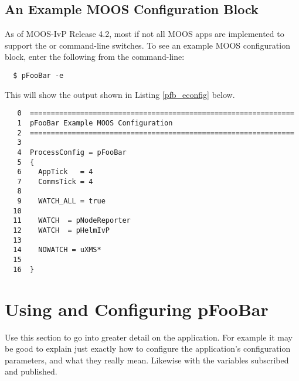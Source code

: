 \subsection{An Example MOOS Configuration Block}

As of MOOS-IvP Release 4.2, most if not all MOOS apps are implemented
to support the  or  command-line switches. To
see an example MOOS configuration block, enter the following from the
command-line:

\small
\begin{verbatim}
  $ pFooBar -e
\end{verbatim}
\normalsize
\vspace{0.05in}

\noindent
This will show the output shown in Listing \ref{pfb_econfig} below.

\vspace{0.25in}
\label{pfb_econfig}
\footnotesize
\begin{verbatim}
   0  =============================================================== 
   1  pFooBar Example MOOS Configuration                        
   2  =============================================================== 
   3  
   4  ProcessConfig = pFooBar
   5  {                                                               
   6    AppTick   = 4                                                 
   7    CommsTick = 4                                                 
   8                                                                  
   9    WATCH_ALL = true                                              
  10                                                                  
  11    WATCH  = pNodeReporter 
  12    WATCH  = pHelmIvP                                             
  13                                                                  
  14    NOWATCH = uXMS*                                               
  15                                                                  
  16  }                                               
\end{verbatim}
\normalsize
 
\section{Using and Configuring pFooBar}
\label{sec_pfoobar_usage}

Use this section to go into greater detail on the application. For example
it may be good to explain just exactly how to configure the application's
configuration parameters, and what they really mean. Likewise with the 
variables subscribed and published.
